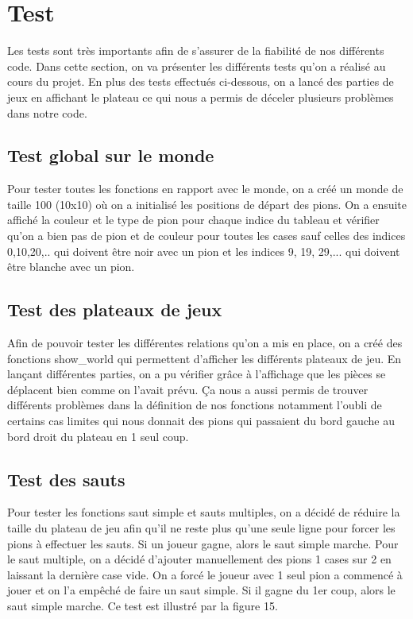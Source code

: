 \documentclass{article}
\begin{document}
\section{Test}

Les tests sont très importants afin de s'assurer de la fiabilité de nos différents code. Dans cette section, on va présenter les différents tests qu'on a réalisé au cours du projet. En plus des tests effectués ci-dessous, on a lancé des parties de jeux en affichant le plateau ce qui nous a permis de déceler plusieurs problèmes dans notre code.

\subsection{Test global sur le monde}

Pour tester toutes les fonctions en rapport avec le monde, on a créé un monde de taille 100 (10x10) où on a initialisé les positions de départ des pions. On a ensuite affiché la couleur et le type de pion pour chaque indice du tableau et vérifier qu’on a bien pas de pion et de couleur pour toutes les cases sauf celles des indices 0,10,20,.. qui doivent être noir avec un pion et les indices 9, 19, 29,... qui doivent être blanche avec un pion.

\subsection{Test des plateaux de jeux}

Afin de pouvoir tester les différentes relations qu’on a mis en place, on a créé des fonctions show\_world  qui permettent d’afficher les différents plateaux de jeu. En lançant différentes parties, on a pu vérifier grâce à l’affichage que les pièces se déplacent bien comme on l’avait prévu. Ça nous a aussi permis de trouver différents problèmes dans la définition de nos fonctions notamment l'oubli de certains cas limites qui nous donnait des pions qui passaient du bord gauche au bord droit du plateau en 1 seul coup.

\subsection{Test des sauts}

Pour tester les fonctions saut simple et sauts multiples, on a décidé de réduire la taille du plateau de jeu afin qu'il ne reste plus qu'une seule ligne pour forcer les pions à effectuer les sauts. Si un joueur gagne, alors le saut simple marche. Pour le saut multiple, on a décidé d'ajouter manuellement des pions 1 cases sur 2 en laissant la dernière case vide. On a forcé le joueur avec 1 seul pion a commencé à jouer et on l'a empêché de faire un saut simple. Si il gagne du 1er coup, alors le saut simple marche. Ce test est illustré par la figure 15.
\end{document}

